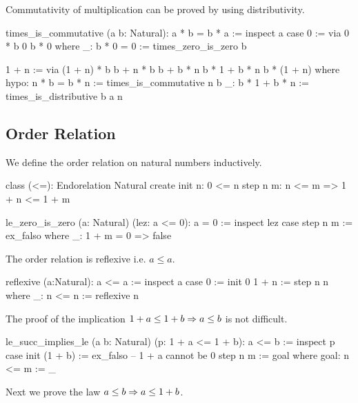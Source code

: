 Commutativity of multiplication can be proved by using distributivity.

\begin{alba}
  times_is_commutative (a b: Natural): a * b = b * a :=
    inspect a case
      0 :=
       via 0 * b
           0
           b * 0
       where
         _: b * 0 = 0 := times_zero_is_zero b

      1 + n :=
        via
          (1 + n) * b
          b + n * b
          b + b * n
          b * 1 + b * n
          b * (1 + n)
        where
          hypo: n * b = b * n := times_is_commutative n b
          _: b * 1 + b * n := times_is_distributive b a n
\end{alba}






\subsection{Order Relation}

We define the order relation on natural numbers inductively.

\begin{alba}
  class
    (<=): Endorelation Natural
  create
    init n: 0 <= n
    step n m: n <= m => 1 + n <= 1 + m
\end{alba}


\begin{alba}
  le_zero_is_zero (a: Natural) (lez: a <= 0): a = 0 :=
    inspect lez case
      step n m :=
        ex_falso where
          _: 1 + m = 0 => false
\end{alba}

The order relation is reflexive i.e. $a \le a$.

\begin{alba}
  reflexive (a:Natural): a <= a :=
    inspect a case
      0 :=
        init 0
      1 + n :=
        step n n where
          _: n <= n := reflexive n
\end{alba}

The proof of the implication $ 1 + a \le 1 + b \Rightarrow a \le b$ is not
difficult.


\begin{alba}
  le_succ_implies_le (a b: Natural) (p: 1 + a <= 1 + b): a <= b :=
    inspect p case
      init (1 + b) :=
        ex_falso      -- 1 + a cannot be 0
      step n m :=
        goal where
          goal: n <= m := _
\end{alba}


Next we prove the law $a \le b \Rightarrow a \le 1 + b$.

